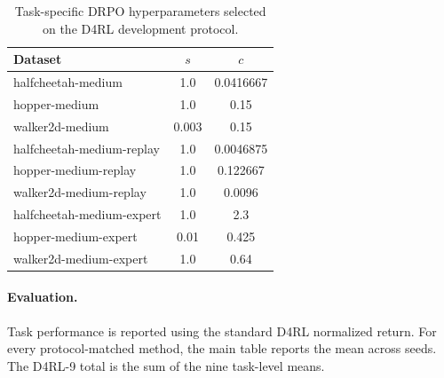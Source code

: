 \documentclass{article}
\theoremstyle{plain}
\theoremstyle{definition}
\theoremstyle{remark}
\begin{document}
\begin{table}[t]
\centering
\caption{Task-specific DRPO hyperparameters selected on the D4RL development
protocol.}
\label{tab:d4rl_drpo_hyperparameters}
\small
\setlength{\tabcolsep}{4pt}
\renewcommand{\arraystretch}{1.05}
\begin{tabular}{lcc}
\toprule
Dataset & \(s\) & \(c\) \\
\midrule
halfcheetah-medium        & 1.0   & 0.0416667 \\
hopper-medium             & 1.0   & 0.15 \\
walker2d-medium           & 0.003 & 0.15 \\
halfcheetah-medium-replay & 1.0   & 0.0046875 \\
hopper-medium-replay      & 1.0   & 0.122667 \\
walker2d-medium-replay    & 1.0   & 0.0096 \\
halfcheetah-medium-expert & 1.0   & 2.3 \\
hopper-medium-expert      & 0.01  & 0.425 \\
walker2d-medium-expert    & 1.0   & 0.64 \\
\bottomrule
\end{tabular}
\end{table}

\paragraph{Evaluation.}

Task performance is reported using the standard D4RL normalized return.
For every protocol-matched method, the main table reports the mean across
seeds. The D4RL-9 total is the sum of the nine task-level means.
\end{document}
